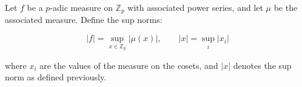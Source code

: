 Let $f$ be a $p$-adic measure on $\mathbb{Z}_p$ with associated power series, and let $\mu$ be the associated measure. Define the sup norms:

$$|f| = \sup_{x \in \mathbb{Z}_p} |\mu(x)|, \qquad |x| = \sup_i |x_i|$$

where $x_i$ are the values of the measure on the cosets, and $|x|$ denotes the sup norm as defined previously.
